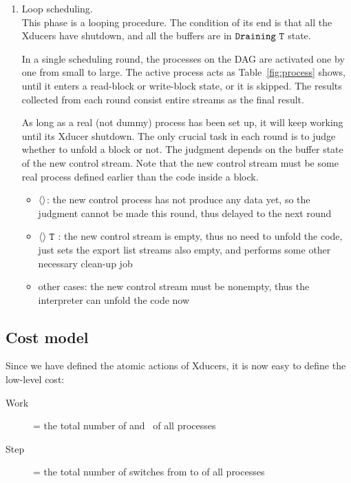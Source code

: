 \begin{enumerate}[(1)]
\begin{itemize}
\end{itemize}


\item Loop scheduling. \\ 
This phase is a looping procedure. The condition of its end is that all the Xducers have shutdown, and all the buffers are in $\texttt{Draining} \  \mathtt{T}$ state. 

In a single scheduling round, the processes on the DAG are activated one by one from small to large.
The active process acts as Table~\ref{fig:process} shows, until it enters a read-block or write-block state, or it is skipped.  
The results collected from each round consist entire streams as the final result.

As long as a real (not dummy) process has been set up, it will keep working until its Xducer shutdown. 
The only crucial task in each round is to judge whether to unfold a \wc block or not. The judgment depends on the buffer state of the new control stream.
Note that the new control stream must be some real process
defined earlier than the code inside a \wc block. 

\begin{itemize}
	\item \filling$\langle \rangle$: the new control process has not produce any data yet, so the judgment cannot be made this round, thus delayed to the next round
	\item \draining$\langle \rangle \ \mathtt{T}$ : the new control stream is empty, thus no need to unfold the code, just sets the export list streams also empty, and performs some other necessary clean-up job  
	\item other cases: the new control stream must be nonempty, thus the interpreter can unfold the code now
\end{itemize}







	
\end{enumerate}

\subsection{Cost model}
Since we have defined the atomic actions of Xducers, it is now easy to define the low-level cost:
\begin{description}
	\item[Work] = the total number of \pin and \pout \  of all processes
	\item[Step] = the total number of switches from \filling to \draining of all processes
\end{description}


